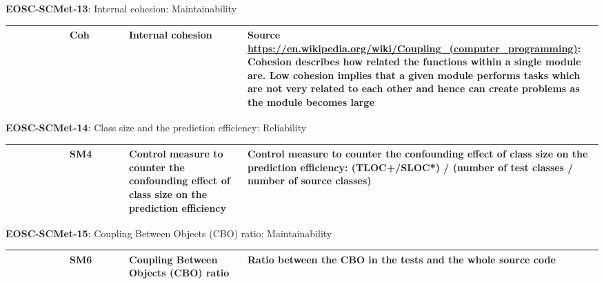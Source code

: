 \textbf{EOSC-SCMet-13}: Internal cohesion: Maintainability
\nopagebreak[4]
\begin{center}
    \tabletail{\hline}
    \tiny
    \begin{supertabular}{|p{0.10\linewidth}|p{0.10\linewidth}|p{0.20\linewidth}|p{0.60\linewidth}|} \hline
        \cite{montagud_systematic_2012} & Coh & Internal cohesion & Source \url{https://en.wikipedia.org/wiki/Coupling_(computer_programming)}: Cohesion describes how related the functions within a single module are. Low cohesion implies that a given module performs tasks which are not very related to each other and hence can create problems as the module becomes large\\ \hline
    \end{supertabular}
\end{center}

\textbf{EOSC-SCMet-14}: Class size and the prediction efficiency: Reliability
\nopagebreak[4]
\begin{center}
    \tabletail{\hline}
    \tiny
    \begin{supertabular}{|p{0.10\linewidth}|p{0.10\linewidth}|p{0.20\linewidth}|p{0.60\linewidth}|} \hline
        \cite{nagappan_early_2005} & SM4 & Control measure to counter the confounding effect of class size on the prediction efficiency & Control measure to counter the confounding effect of class size on the prediction efficiency: (TLOC+/SLOC*) / (number of test classes / number of source classes)\\ \hline
    \end{supertabular}
\end{center}

\textbf{EOSC-SCMet-15}: Coupling Between Objects (CBO) ratio: Maintainability
\nopagebreak[4]
\begin{center}
    \tabletail{\hline}
    \tiny
    \begin{supertabular}{|p{0.10\linewidth}|p{0.10\linewidth}|p{0.20\linewidth}|p{0.60\linewidth}|} \hline
        \cite{nagappan_early_2005} & SM6 & Coupling Between Objects (CBO) ratio & Ratio between the CBO in the tests and the whole source code\\ \hline
    \end{supertabular}
\end{center}

